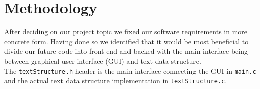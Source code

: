 \section{Methodology}\label{sec:meto}
After deciding on our project topic we fixed our software requirements in more concrete form. Having done so we identified that it would be most beneficial to divide our future code into front end and backed with the main interface being between graphical user interface (GUI) and text data structure. \\
The \verb|textStructure.h| header is the main interface connecting the GUI in \verb|main.c| and the actual text data structure implementation in \verb|textStructure.c|.
